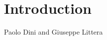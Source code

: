 \chapter{Introduction}
\label{ch:Introduction}

\vspace{-1cm}
\begin{center}
Paolo Dini and Giuseppe Littera
\end{center}















\newpage











